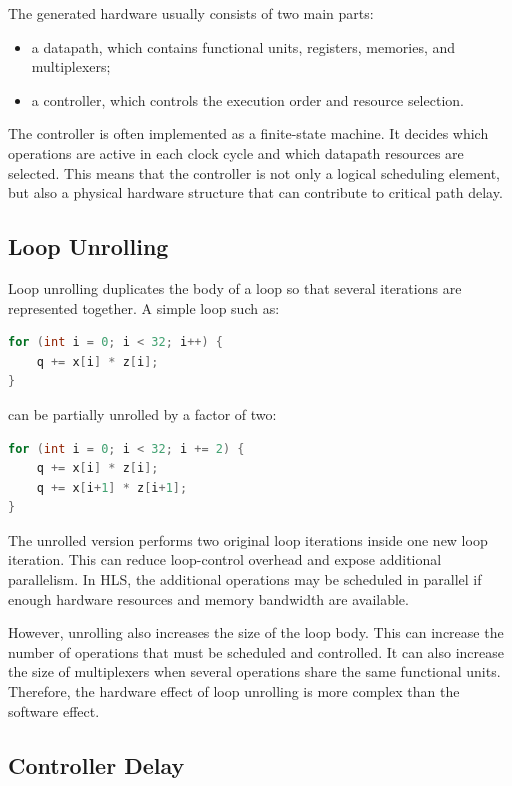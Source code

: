 \documentclass[conference]{IEEEtran}
\begin{document}
The generated hardware usually consists of two main parts:

\begin{itemize}
    \item a datapath, which contains functional units, registers, memories, and multiplexers;
    \item a controller, which controls the execution order and resource selection.
\end{itemize}

The controller is often implemented as a finite-state machine. It decides which operations are active in each clock cycle and which datapath resources are selected. This means that the controller is not only a logical scheduling element, but also a physical hardware structure that can contribute to critical path delay.

\subsection{Loop Unrolling}

Loop unrolling duplicates the body of a loop so that several iterations are represented together. A simple loop such as:

\begin{lstlisting}[language=C]
for (int i = 0; i < 32; i++) {
    q += x[i] * z[i];
}
\end{lstlisting}

can be partially unrolled by a factor of two:

\begin{lstlisting}[language=C]
for (int i = 0; i < 32; i += 2) {
    q += x[i] * z[i];
    q += x[i+1] * z[i+1];
}
\end{lstlisting}

The unrolled version performs two original loop iterations inside one new loop iteration. This can reduce loop-control overhead and expose additional parallelism. In HLS, the additional operations may be scheduled in parallel if enough hardware resources and memory bandwidth are available.

However, unrolling also increases the size of the loop body. This can increase the number of operations that must be scheduled and controlled. It can also increase the size of multiplexers when several operations share the same functional units. Therefore, the hardware effect of loop unrolling is more complex than the software effect.

\subsection{Controller Delay}
\end{document}
